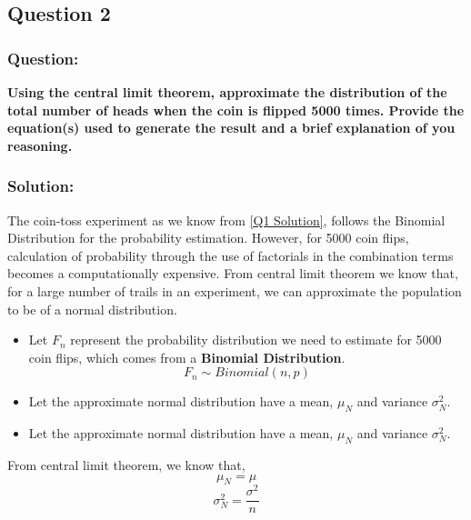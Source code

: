\documentclass[12pt,twoside,a4paper]{article}
\begin{document}
\subsection{Question 2}

\subsubsection*{Question:}
\textbf{Using the central limit theorem, approximate the distribution of the total number of heads when the coin is flipped 5000 times. Provide the equation(s) used to generate the result and a brief explanation of you reasoning.}

\subsubsection*{Solution:}
The coin-toss experiment as we know from \ref{Q1 Solution}, follows the Binomial Distribution for the probability estimation. However, for 5000 coin flips, calculation of probability through the use of factorials in the combination terms becomes a computationally expensive. From central limit theorem we know that, for a large number of trails in an experiment, we can approximate the population to be of a normal distribution. \\
\begin{itemize}
    \item Let $F_n$ represent the probability distribution we need to estimate for 5000 coin flips, which comes from a \textbf{Binomial Distribution}. $$F_n \sim Binomial(n, p)$$
    \item Let the approximate normal distribution have a mean, $\mu_N$ and variance $\sigma^2_N$.
    \item Let the approximate normal distribution have a mean, $\mu_N$ and variance $\sigma^2_N$.
\end{itemize}
From central limit theorem, we know that,
\begin{equation}\label{DMEAN}
    \mu_N = \mu
\end{equation}
\begin{equation}\label{DVAR}
    \sigma_N^2 = \frac{\sigma^2}{n}
\end{equation}
\end{document}
